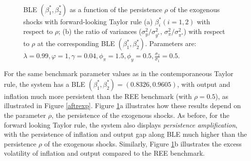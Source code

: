 \begin{figure}
    \begin{center}
        \mbox{
        }
   \end{center}
   \caption{ \label{blerhotrexp}
   BLE $(\beta^*_1, \beta^*_2)$ as a function of the persistence $\rho$ of the exogenous shocks with forward-looking Taylor rule (a) $\beta^*_i (i=1,2)$ with respect to $\rho$;  (b) the ratio of variances ($\sigma_y^2/\sigma_{y^*}^2$, $\sigma_\pi^2/\sigma_{\pi^*}^2$) with respect to $\rho$ at the corresponding BLE $(\beta^*_1, \beta^*_2)$. Parameters are: $\lambda=0.99, \varphi=1, \gamma=0.04, \phi_\pi=1.5,\phi_y=0.5, \frac{\sigma_2}{\sigma_1}=0.5$.  }
    \end{figure}

For the same benchmark parameter values as in the contemporaneous Taylor rule, the system has a BLE $(\beta_1^*,\beta_2^*)=(0.8326, 0.9605)$, with output and inflation much more persistent than the REE benchmark (with $\rho=0.5$), as illustrated in Figure \ref{aftrexp}. Figure \ref{blerhotrexp}a illustrates how these results depend on the parameter $\rho$, the persistence of the exogenous shocks. As before, for the forward looking Taylor rule, the system also displays {\it persistence amplification}, with the persistence of inflation and output gap along BLE much higher than the persistence $\rho$ of the exogenous shocks. Similarly, Figure \ref{blerhotrexp}b illustrates the excess volatility of inflation and output compared to the REE benchmark.

